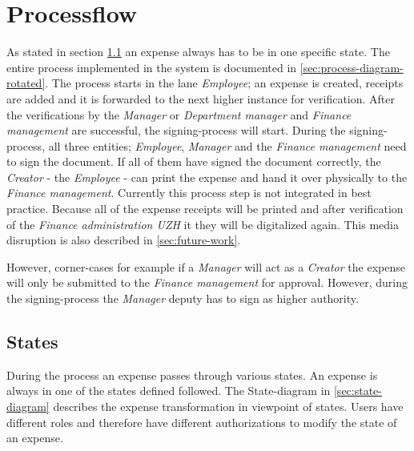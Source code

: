 \section{Processflow}
\label{sec:processflow}
As stated in section \ref{sec:states} an expense always has to be in one specific state. The entire process implemented in the system is documented in \ref{sec:process-diagram-rotated}.\newline 
The process starts in the lane \textit{Employee}; an expense is created, receipts are added and it is forwarded to the next higher instance for verification. After the verifications by the \textit{Manager} or \textit{Department manager} and \textit{Finance management} are successful, the signing-process will start. During the signing-process, all three entities; \textit{Employee}, \textit{Manager} and the \textit{Finance management} need to sign the document. If all of them have signed the document correctly, the \textit{Creator} - the \textit{Employee} - can print the expense and hand it over physically to the \textit{Finance management}. Currently this process step is not integrated in best practice. Because all of the expense receipts will be printed and after verification of the \textit{Finance administration UZH} it they will be digitalized again. This media disruption is also described in \ref{sec:future-work}.\par
However, corner-cases for example if a \textit{Manager} will act as a \textit{Creator} the expense will only be submitted to the \textit{Finance management} for approval. However, during the signing-process the \textit{Manager} deputy has to sign as higher authority.

\subsection{States}
\label{sec:states}
During the process an expense passes through various states. An expense is always in one of the states defined followed. The State-diagram in \ref{sec:state-diagram} describes the expense transformation in viewpoint of states. Users have different roles and therefore have different authorizations to modify the state of an expense. 


